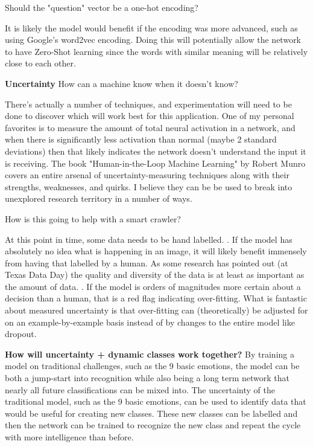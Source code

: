 \documentclass{article}
\newcommand{\br}{ \hfill \break}
\begin{document}
\begin{adjustwidth}{2.5em}{0pt}
\begin{adjustwidth}{2.5em}{0pt}
\end{adjustwidth} \br
Should the "question" vector be a one-hot encoding?
\br\begin{adjustwidth}{2.5em}{0pt}
It is likely the model would benefit if the encoding was more advanced, such as using Google's word2vec encoding. Doing this will potentially allow the network to have Zero-Shot learning since the words with similar meaning will be relatively close to each other.
\end{adjustwidth} \br
\br
\textbf{Uncertainty}\br
How can a machine know when it doesn't know?
\br\begin{adjustwidth}{2.5em}{0pt}
There's actually a number of techniques, and experimentation will need to be done to discover which will work best for this application. One of my personal favorites is to measure the amount of total neural activation in a network, and when there is significantly less activation than normal (maybe 2 standard deviations) then that likely indicates the network doesn't understand the input it is receiving. The book "Human-in-the-Loop Machine Learning" by Robert Munro covers an entire arsenal of uncertainty-measuring techniques along with their strengths, weaknesses, and quirks. I believe they can be be used to break into unexplored research territory in a number of ways.\br
\end{adjustwidth} \br
How is this going to help with a smart crawler?
\br\begin{adjustwidth}{2.5em}{0pt}
At this point in time, some data needs to be hand labelled. \br
1. If the model has absolutely no idea what is happening in an image, it will likely benefit immensely from having that labelled by a human. As some research has pointed out (at Texas Data Day) the quality and diversity of the data is at least as important as the amount of data.\br
2. If the model is orders of magnitudes more certain about a decision than a human, that is a red flag indicating over-fitting. What is fantastic about measured uncertainty is that over-fitting can (theoretically) be adjusted for on an example-by-example basis instead of by changes to the entire model like dropout.
\end{adjustwidth} \br

\textbf{How will uncertainty + dynamic classes work together?}
By training a model on traditional challenges, such as the 9 basic emotions, the model can be both a jump-start into recognition while also being a long term network that nearly all future classifications can be mixed into. The uncertainty of the traditional model, such as the 9 basic emotions, can be used to identify data that would be useful for creating new classes. These new classes can be labelled and then the network can be trained to recognize the new class and repeat the cycle with more intelligence than before.

\end{adjustwidth} \br %
\end{document}
